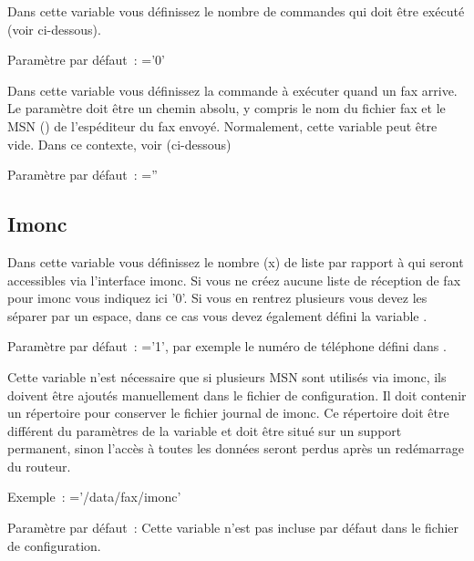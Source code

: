 \begin {description}


    {Dans cette variable vous définissez le nombre de commandes qui doit être
	exécuté (voir ci-dessous).

        Paramètre par défaut~: ='0'}


    {Dans cette variable vous définissez la commande à exécuter quand un fax arrive.
	Le paramètre doit être un chemin absolu, y compris le nom du fichier fax et le MSN
	() de l'espéditeur du fax envoyé. Normalement, cette
	variable peut être vide. Dans ce contexte, voir  (ci-dessous)

        Paramètre par défaut~: =''}

\end {description}

\subsection{Imonc}

\begin {description}


    {Dans cette variable vous définissez le nombre (x) de liste par rapport à 
	qui seront accessibles via l'interface imonc. Si vous ne créez aucune liste de
	réception de fax pour imonc vous indiquez ici '0'. Si vous en rentrez plusieurs
	vous devez les séparer par un espace, dans ce cas vous devez également défini
	la variable .

        Paramètre par défaut~:
            ='1', par exemple le numéro de téléphone
				défini dans .}


    {Cette variable n'est nécessaire que si plusieurs MSN sont utilisés via imonc,
	ils doivent être ajoutés manuellement dans le fichier de configuration.
	Il doit contenir un répertoire pour conserver le fichier journal de imonc.
	Ce répertoire doit être différent du paramètres de la variable 
	et doit être situé sur un support permanent, sinon l'accès à toutes les données
	seront perdus après un redémarrage du routeur.

        Exemple~:
            ='/data/fax/imonc'

        Paramètre par défaut~:
            Cette variable n'est pas incluse par défaut dans le fichier de configuration.}

\end{description}

